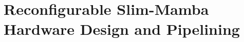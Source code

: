 \documentclass[lettersize,journal]{IEEEtran}
\begin{document}

% 


\section{Reconfigurable Slim-Mamba Hardware Design and Pipelining}
\label{sec:reconfigurable_hw}
\end{document}
